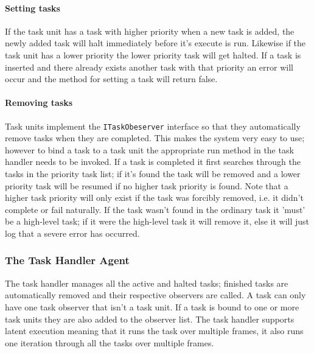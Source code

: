 \paragraph{Setting tasks}
If the task unit has a task with higher priority when a new task is added, the newly added task will
halt immediately before it's execute is run. Likewise if the task unit has a lower priority the
lower priority task will get halted. If a task is inserted and there already exists another task
with that priority an error will occur and the method for setting a task will return false.

\paragraph{Removing tasks} 
Task units implement the \texttt{ITaskObeserver} interface so that they automatically remove tasks
when they are completed. This makes the system very easy to use; however to bind a task to a task
unit the appropriate run method in the task handler needs to be invoked. If a task is completed it
first searches through the tasks in the priority task list; if it's found the task will be removed
and a lower priority task will be resumed if no higher task priority is found. Note that a higher
task priority will only exist if the task was forcibly removed, i.e. it didn't complete or fail
naturally. If the task wasn't found in the ordinary task it 'must' be a high-level task; if it were
the high-level task it will remove it, else it will just log that a severe error has occurred.




\subsubsection{The Task Handler Agent}
The task handler manages all the active and halted tasks; finished tasks are automatically removed
and their respective observers are called. A task can only have one task observer that isn't a task
unit. If a task is bound to one or more task units they are also added to the observer list. The task handler
supports latent execution meaning that it runs the task over multiple frames, it also runs one
iteration through all the tasks over multiple frames.

